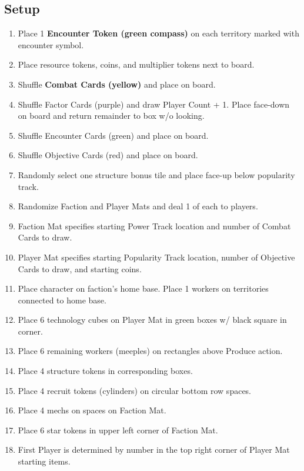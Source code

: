 \documentclass[12pt]{article}
\newenvironment{enumerateCustom}
{\begin{enumerate}
  \setlength{\itemsep}{1pt}
  \setlength{\parskip}{0pt}
  \setlength{\parsep}{0pt}}
{\end{enumerate}}
\begin{document}
\begin{multicols*}{2}

\section*{Setup}
\begin{enumerateCustom}
    \item Place 1 \textbf{Encounter Token (green compass)} on each territory marked with encounter symbol.
    \item Place resource tokens, coins, and multiplier tokens next to board.
    \item Shuffle \textbf{Combat Cards (yellow)} and place on board.
    \item Shuffle Factor Cards (purple) and draw Player Count + 1. Place face-down on board and return remainder to box w/o looking.
    \item Shuffle Encounter Cards (green) and place on board.
    \item Shuffle Objective Cards (red) and place on board.
    \item Randomly select one structure bonus tile and place face-up below popularity track.
    \item Randomize Faction and Player Mats and deal 1 of each to players.
    \item Faction Mat specifies starting Power Track location and number of Combat Cards to draw.
    \item Player Mat specifies starting Popularity Track location, number of Objective Cards to draw, and starting coins.
    \item Place character on faction's home base. Place 1 workers on territories connected to home base.
    \item Place 6 technology cubes on Player Mat in green boxes w/ black square in corner.
    \item Place 6 remaining workers (meeples) on rectangles above Produce action.
    \item Place 4 structure tokens in corresponding boxes.
    \item Place 4 recruit tokens (cylinders) on circular bottom row spaces.
    \item Place 4 mechs on spaces on Faction Mat.
    \item Place 6 star tokens in upper left corner of Faction Mat.
    \item First Player is determined by number in the top right corner of Player Mat starting items.
\end{enumerateCustom}


\end{multicols*}
\end{document}
